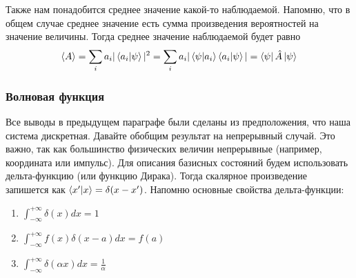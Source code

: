 Также нам понадобится среднее значение какой-то наблюдаемой. Напомню, что в общем случае среднее значение есть сумма произведения вероятностей на значение величины. Тогда среднее значение наблюдаемой будет равно
\[
\langle A \rangle = \sum_i a_i |\bra{a_i}\ket{\psi}|^2 = \sum_i a_i |\bra{\psi}\ket{a_i}\bra{a_i}\ket{\psi}| = \bra{\psi}\hat{A}\ket{\psi}
\]
\subsubsection*{Волновая функция}
\hspace{1em} Все выводы в предыдущем параграфе были сделаны из предположения, что наша система дискретная. Давайте обобщим результат на непрерывный случай. Это важно, так как большинство физических величин непрерывные (например, координата или импульс). Для описания базисных состояний будем использовать дельта-функцию (или функцию Дирака). Тогда скалярное произведение запишется как $\bra{x'}\ket{x} = \delta(x - x')$. Напомню основные свойства дельта-функции:
\begin{enumerate}
    \item $\int_{-\infty}^{+\infty}\delta(x)dx = 1$
    \item $\int^{+\infty}_{-\infty}f(x)\delta(x-a)dx = f(a)$
    \item $\int^{+\infty}_{-\infty}\delta(\alpha x)dx = \frac{1}{\alpha}$
\end{enumerate}

